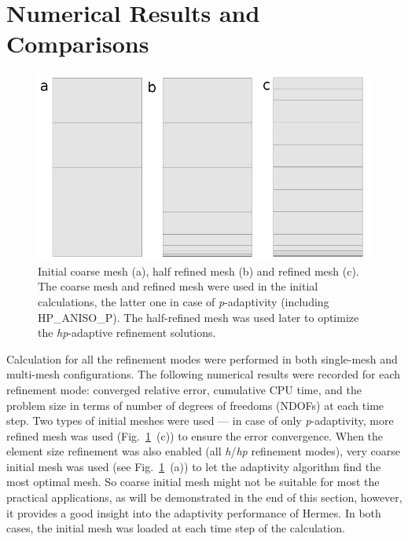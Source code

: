 \section{Numerical Results and Comparisons}\label{sec:results}

\begin{figure}[!ht]
  \begin{centering}
  \includegraphics[width=.8\columnwidth]{mesh}
  \caption{\label{fig:mesh} Initial coarse mesh (a),
  	half refined mesh (b) and refined mesh (c). The coarse mesh
	and refined mesh were used in the initial calculations, the latter one
	in case of \emph{p}-adaptivity (including HP\_ANISO\_P). The half-refined mesh was
	used later to optimize the \emph{hp}-adaptive refinement solutions.}
  \end{centering}
\end{figure}
Calculation for all the refinement modes were performed
in both single-mesh and multi-mesh configurations. 
The following numerical results were recorded for each 
refinement mode: converged relative error, cumulative CPU
time, and the problem size in terms of number
of degrees of freedoms (NDOFs) at each time step. 
Two types of initial meshes were used --- in case of only \emph{p}-adaptivity,
more refined mesh was used (Fig.~\ref{fig:mesh}~(c)) to ensure
the error convergence.
When the element size refinement
was also enabled (all \emph{h}/\emph{hp} refinement modes), very coarse initial mesh
was used (see Fig.~\ref{fig:mesh}~(a)) to let the adaptivity
algorithm find the most optimal mesh. So coarse initial mesh might not be
suitable for most the practical applications, as will be demonstrated in the
end of this section, however, it provides a good insight into the
adaptivity performance of Hermes.
In both cases, the initial mesh was loaded at each time step of the
calculation.

